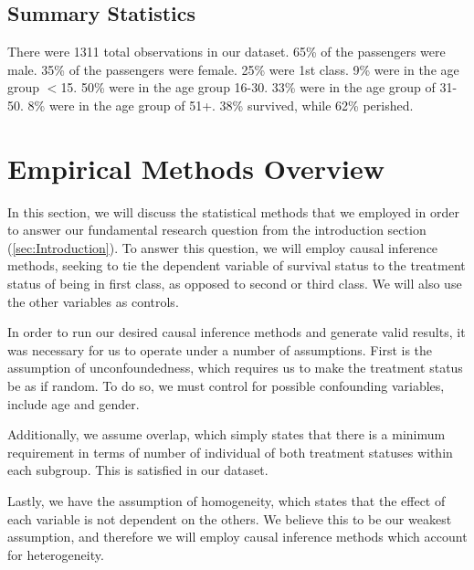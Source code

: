 \documentclass[12pt]{article}
\begin{document}
\subsection{Summary Statistics}
\doublespacing
There were 1311 total observations in our dataset. 65\% of the passengers were male. 35\% of the passengers were female. 25\% were 1st class. 9\% were in the age group $<$15. 50\% were in the age group 16-30. 33\% were in the age group of 31-50. 8\% were in the age group of 51+. 38\% survived, while 62\% perished.

\section{Empirical Methods Overview}
\doublespacing

In this section, we will discuss the statistical methods that we employed in order to answer our fundamental research question from the introduction section (\ref{sec:Introduction}). To answer this question, we will employ causal inference methods, seeking to tie the dependent variable of survival status to the treatment status of being in first class, as opposed to second or third class. We will also use the other variables as controls.

In order to run our desired causal inference methods and generate valid results, it was necessary for us to operate under a number of assumptions. First is the assumption of unconfoundedness, which requires us to make the treatment status be as if random. To do so, we must control for possible confounding variables, include age and gender.

Additionally, we assume overlap, which simply states that there is a minimum requirement in terms of number of individual of both treatment statuses within each subgroup. This is satisfied in our dataset.

Lastly, we have the assumption of homogeneity, which states that the effect of each variable is not dependent on the others. We believe this to be our weakest assumption, and therefore we will employ causal inference methods which account for heterogeneity. 
\end{document}

